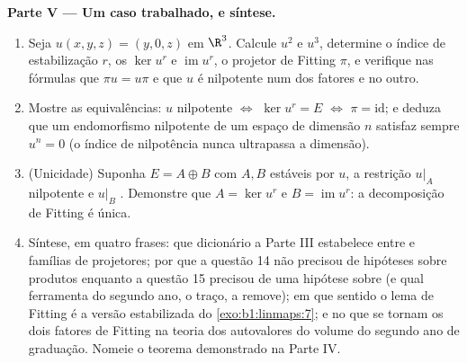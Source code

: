 \begin{problem}
\medskip
\noindent\textbf{Parte V --- Um caso trabalhado, e síntese.}
\begin{enumerate}[resume]
  \item Seja $u(x, y, z) = (y, 0, z)$ em $\R^3$. Calcule $u^2$ e $u^3$, determine o
        índice de estabilização $r$, os  $\ker u^{r}$ e $\operatorname{im} u^{r}$, o
        projetor de Fitting $\pi$, e verifique nas fórmulas que
        $\pi u = u\pi$ e que $u$ é nilpotente num dos fatores e  no
        outro.
  \item Mostre as equivalências: $u$ nilpotente $\iff$ $\ker u^{r} =
        E$
        $\iff$ $\pi = \mathrm{id}$; e deduza que um endomorfismo nilpotente de um
        espaço de dimensão $n$ satisfaz sempre $u^{n} = 0$ (o índice de
        nilpotência nunca ultrapassa a dimensão).
  \item (Unicidade) Suponha $E = A \oplus B$ com $A, B$ estáveis por $u$, a
        restrição $u|_A$ nilpotente e $u|_B$ . Demonstre
        que $A = \ker u^{r}$ e $B =
        \operatorname{im} u^{r}$: a decomposição de Fitting é única.
  \item Síntese, em quatro frases: que dicionário a Parte III
        estabelece entre  e famílias de projetores;
        por que a questão 14 não precisou de hipóteses sobre
        produtos enquanto a questão 15 precisou de uma hipótese
        sobre  (e qual ferramenta do segundo ano, o traço, a
        remove); em que sentido o lema de Fitting é a versão
        estabilizada do \cref{exo:b1:linmaps:7}; e no que se tornam os dois fatores
        de Fitting na teoria dos autovalores do volume do segundo
        ano de graduação. Nomeie o teorema demonstrado na Parte IV.
\end{enumerate}
\end{problem}
